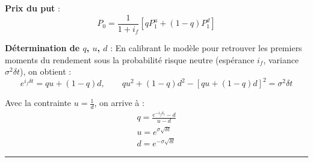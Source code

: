 \begin{f}
\textbf{Prix du put} :
\[
P_{0} = \frac{1}{1+i_f} \left[ q P_{1}^{u} + (1 - q) P_{1}^{d} \right]
\]

\textbf{Détermination de $q$, $u$, $d$} :  
En calibrant le modèle pour retrouver les premiers moments du rendement sous la probabilité risque neutre (espérance $i_f$, variance $\sigma^2 \delta t$), on obtient :
\[
e^{i_{f} \delta t} = q u + (1-q) d, \qquad q u^2 + (1-q) d^2 - [q u + (1-q) d]^2 = \sigma^2 \delta t
\]

Avec la contrainte $u = \frac{1}{d}$, on arrive à :
\[
\begin{array}{l}
	q = \frac{e^{-i_f \delta_t} - d}{u - d} \\
	u = e^{\sigma \sqrt{\delta t}} \\
	d = e^{-\sigma \sqrt{\delta t}}
\end{array}
\]

\end{f}
\hrule

